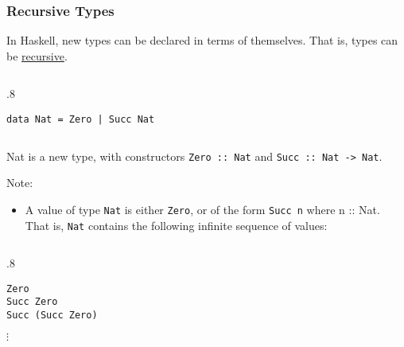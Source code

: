 \documentclass{beamer}
\newenvironment{codeblock}[1][.8]{%
\begin{columns}
\begin{column}{#1\linewidth}
\begin{exampleblock}{}}{%
\end{exampleblock}
\end{column}
\end{columns}}
\newenvironment{execblock}[1][.8]{%
\begin{columns}
\begin{column}{#1\linewidth}
\begin{block}{}}{%
\end{block}
\end{column}
\end{columns}}
\def\slideskip{\vskip 0.1in}
\begin{document}
\begin{frame}[fragile]
\Large

\frametitle{Recursive Types}

In Haskell, new types can be declared in terms of 
themselves.  That is, types can be \underline{recursive}. 

\slideskip

\begin{codeblock}
\vspace{-2ex}
\begin{verbatim}
data Nat = Zero | Succ Nat
\end{verbatim}
\vspace{-2ex}
\end{codeblock}

\slideskip
Nat is a new type, with constructors 
{\tt Zero :: Nat} and {\tt Succ :: Nat -> Nat}.

\end{frame}

\begin{frame}[fragile]

Note: 
\begin{itemize}
\item A value of type {\tt Nat} is either {\tt Zero}, or of the form 
{\tt Succ n} where {n :: Nat}.  That is, {\tt Nat} contains the 
following infinite sequence of values: 
\end{itemize}

\begin{execblock}
\vspace{-2ex}
\begin{verbatim}
Zero
Succ Zero
Succ (Succ Zero)
\end{verbatim}
\vspace{-2ex}
\hskip 1in {\Huge$\vdots$}
\end{execblock}


\end{frame}
\end{document}
